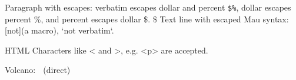 Paragraph with escapes: verbatim escapes dollar and percent \texttt{\$\%}, dollar escapes percent \%, and percent escapes dollar \$. \$ Text line with escaped Mau syntax: [not](a macro), `not verbatim`.


HTML Characters like \textless{} and \textgreater{}, e.g. \textless{}p\textgreater{} are accepted.


Volcano: 🌋 (direct)

